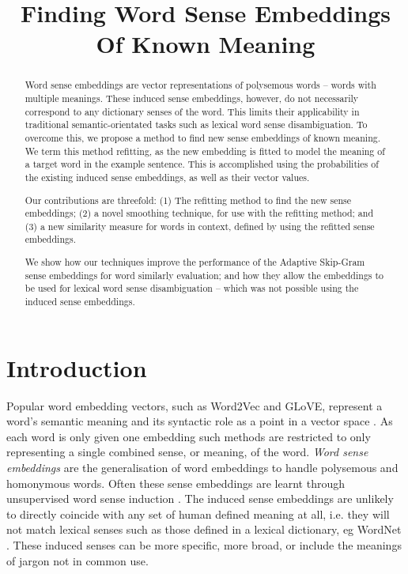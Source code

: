 \documentclass{article}
\def\parencite{\cite}
\begin{document}
\title{Finding Word Sense Embeddings Of Known Meaning}


\maketitle

\begin{abstract}
Word sense embeddings are vector representations of polysemous words -- words with multiple meanings.
These induced sense embeddings, however, do not necessarily correspond to any dictionary senses of the word.
This limits their applicability in traditional semantic-orientated tasks such as lexical word sense disambiguation.
To overcome this, we propose a method to find new sense embeddings of known meaning.
We term this method refitting, as the new embedding is fitted to model the meaning of a target word in the example sentence.
This is accomplished using the probabilities of the existing induced sense embeddings, as well as their vector values.

Our contributions are threefold:
(1) The refitting method to find the new sense embeddings;
 (2) a novel smoothing technique, for use with the refitting method;
and (3) a new similarity measure for words in context, defined by using the refitted sense embeddings.

We show how our techniques improve the performance of the Adaptive Skip-Gram sense embeddings for word similarly evaluation; and how they allow the embeddings to be used for lexical word sense disambiguation -- which was not possible using the induced sense embeddings.
\end{abstract}


\section{Introduction}


Popular word embedding vectors, such as Word2Vec and GLoVE, represent a word's semantic meaning and its syntactic role as a point in a vector space \parencite{mikolov2013efficient, pennington2014glove}. As each word is only given one embedding such methods are restricted to only representing a single combined sense, or meaning, of the word. \emph{Word sense embeddings} are the generalisation of word embeddings to handle polysemous and homonymous  words. Often these sense embeddings are learnt through unsupervised word sense induction \parencite{Reisinger2010,Huang2012,tian2014probabilistic,AdaGrams}. The induced sense embeddings are unlikely to directly coincide with any set of human defined meaning at all, i.e. they will not match lexical senses such as those defined in a lexical dictionary, eg WordNet \parencite{miller1995wordnet}. These induced senses can be more specific, more broad, or include the meanings of jargon not in common use.
\end{document}
